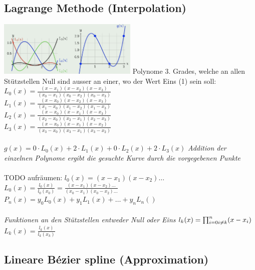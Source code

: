 \subsection{Lagrange Methode (Interpolation)}

\includegraphics[width=0.5\textwidth]{assets/Lagrange1.png}
Polynome 3. Grades, welche an allen Stützstellen Null sind ausser an einer, wo der Wert Eins (1) sein soll:
$L_0(x) = \frac{(x-x_1)(x-x_2)(x-x_3)}{(x_0-x_1)(x_0-x_2)(x_0-x_3)}$ \\
$L_1(x) = \frac{(x-x_0)(x-x_2)(x-x_3)}{(x_1-x_0)(x_1-x_2)(x_1-x_3)}$ \\
$L_2(x) = \frac{(x-x_0)(x-x_1)(x-x_3)}{(x_2-x_0)(x_2-x_1)(x_2-x_3)}$ \\
$L_3(x) = \frac{(x-x_0)(x-x_1)(x-x_2)}{(x_3-x_0)(x_3-x_1)(x_3-x_2)}$ \\
\\
$g(x) = 0 \cdot L_0(x) + 2 \cdot L_1(x) + 0 \cdot L_2(x) + 2 \cdot L_3(x)$
\textit{Addition der einzelnen Polynome ergibt die gesuchte Kurve durch die vorgegebenen Punkte}\\
\\

TODO aufräumen:
$l_0(x) = (x-x_1)(x-x_2)\dots$ \\
$L_0(x) = \frac{l_0(x)}{l_0(x_0)} = \frac{(x-x_1)(x-x_2)\dots}{(x_0-x_1)(x_0-x_2)\dots}$ \\
$P_n(x) = y_0L_0(x)+y_1L_1(x)+ \dots + y_nL_n()$ \\
\\
\textit{Funktionen an den Stützstellen entweder Null oder Eins}
$l_k(x) = \prod^{n}_{i=0 \\ i \neq k}(x-x_i)$ \\
$L_k(x) = \frac{l_k(x)}{l_k(x_k)}$

\subsection{Lineare Bézier spline (Approximation)}

